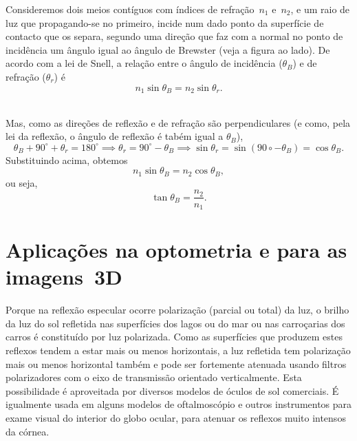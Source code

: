 \noindent
\begin{minipage}[t]{0.75\linewidth}
Consideremos dois meios contíguos com
índices de refração~$n_1$ e~$n_2$, e um raio de luz que propagando-se no
primeiro, incide num dado ponto da superfície de contacto que os separa, segundo
uma direção que faz com a normal no ponto de incidência um ângulo igual ao
ângulo de Brewster (veja a figura ao lado).
De acordo com a lei de Snell, a relação entre o ângulo de incidência
($\theta_B$) e de refração ($\theta_r$) é
\begin{equation*}
n_1\sin\theta_B=n_2\sin\theta_r.
\end{equation*}
\end{minipage}\hfill
{}\\[3mm]
Mas, como as direções de reflexão e de refração são perpendiculares (e como,
pela lei da reflexão, o ângulo de reflexão é tabém igual a $\theta_B$), 
\begin{equation*}
\theta_B+90^\circ+\theta_r=180^\circ\implies
\theta_r=90^\circ-\theta_B\implies
\sin\theta_r=\sin(90\circ-\theta_B)=\cos\theta_B.
\end{equation*}
Substituindo acima, obtemos
\begin{equation*}
n_1\sin\theta_B=n_2\cos\theta_B,
\end{equation*}
ou seja,
\begin{equation*}
\tan\theta_B=\frac{n_2}{n_1}.
\end{equation*}




\section{Aplicações na optometria e para as imagens~3D}
Porque na reflexão especular ocorre polarização (parcial ou total) da luz, o
brilho da luz do sol refletida nas superfícies dos lagos ou do mar ou nas
carroçarias dos carros é constituído por luz polarizada. Como as superfícies
que produzem estes reflexos tendem a estar mais ou menos horizontais, a luz
refletida tem polarização mais ou menos horizontal também e pode ser fortemente
atenuada usando filtros polarizadores com o eixo de transmissão orientado
verticalmente. Esta possibilidade é aproveitada por diversos modelos de óculos
de sol comerciais. É igualmente usada em alguns modelos de oftalmoscópio e
outros instrumentos para exame visual do interior do globo ocular, para
atenuar os reflexos muito intensos da córnea.

